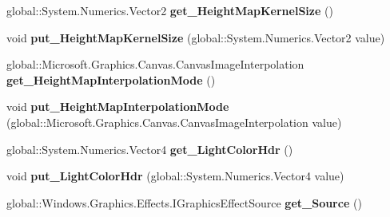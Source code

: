 \begin{DoxyCompactItemize}
global\+::\+System.\+Numerics.\+Vector2 {\bfseries get\+\_\+\+Height\+Map\+Kernel\+Size} ()
\item 
\mbox{\label{class_microsoft_1_1_graphics_1_1_canvas_1_1_effects_1_1_spot_diffuse_effect_a1fcfd03603c1fe8079c16748d9208114}} 
void {\bfseries put\+\_\+\+Height\+Map\+Kernel\+Size} (global\+::\+System.\+Numerics.\+Vector2 value)
\item 
\mbox{\label{class_microsoft_1_1_graphics_1_1_canvas_1_1_effects_1_1_spot_diffuse_effect_a8a26bf0b96be84d07194449d79d4ede8}} 
global\+::\+Microsoft.\+Graphics.\+Canvas.\+Canvas\+Image\+Interpolation {\bfseries get\+\_\+\+Height\+Map\+Interpolation\+Mode} ()
\item 
\mbox{\label{class_microsoft_1_1_graphics_1_1_canvas_1_1_effects_1_1_spot_diffuse_effect_a4dae591b040423df603af220d72dd47c}} 
void {\bfseries put\+\_\+\+Height\+Map\+Interpolation\+Mode} (global\+::\+Microsoft.\+Graphics.\+Canvas.\+Canvas\+Image\+Interpolation value)
\item 
\mbox{\label{class_microsoft_1_1_graphics_1_1_canvas_1_1_effects_1_1_spot_diffuse_effect_a9829a6e6e2b9dfb7c2827d22bdb35cdc}} 
global\+::\+System.\+Numerics.\+Vector4 {\bfseries get\+\_\+\+Light\+Color\+Hdr} ()
\item 
\mbox{\label{class_microsoft_1_1_graphics_1_1_canvas_1_1_effects_1_1_spot_diffuse_effect_a7e497d4948b809486da301590ccaf33b}} 
void {\bfseries put\+\_\+\+Light\+Color\+Hdr} (global\+::\+System.\+Numerics.\+Vector4 value)
\item 
\mbox{\label{class_microsoft_1_1_graphics_1_1_canvas_1_1_effects_1_1_spot_diffuse_effect_a3d4b27d532917eadc8c985089601373b}} 
global\+::\+Windows.\+Graphics.\+Effects.\+I\+Graphics\+Effect\+Source {\bfseries get\+\_\+\+Source} ()
\item 
\mbox{\label{class_microsoft_1_1_graphics_1_1_canvas_1_1_effects_1_1_spot_diffuse_effect_adde8fed8790d528b2cc638b20c8f8c1b}} 

\end{DoxyCompactItemize}
